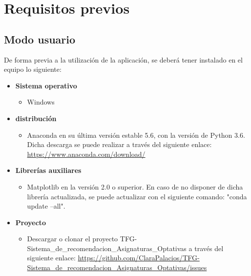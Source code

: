 
\section{Requisitos previos}
\subsection{Modo usuario}
De forma previa a la utilización de la aplicación, se deberá tener instalado en el equipo lo siguiente: 
\begin{itemize}
\item \textbf{Sistema operativo}
\begin{itemize}
\item Windows
\end{itemize} 
\item \textbf{distribución}
\begin{itemize}
\item Anaconda en su última versión estable 5.6, con la versión de Python 3.6. Dicha descarga se puede realizar a través del siguiente enlace: \url{https://www.anaconda.com/download/}
\end{itemize}
\item \textbf{Librerías auxiliares}
\begin{itemize}
\item Matplotlib en la versión 2.0 o superior. En caso de no disponer de dicha librería actualizada, se puede actualizar con el siguiente comando: "conda update --all".
\end{itemize}
\item \textbf{Proyecto}
\begin{itemize}
\item Descargar o clonar el proyecto TFG-Sistema\_de\_recomendacion\_Asignaturas\_Optativas a través del siguiente enlace: \url{https://github.com/ClaraPalacios/TFG-Sistema_de_recomendacion_Asignaturas_Optativas/issues}
\end{itemize}
\end{itemize}

